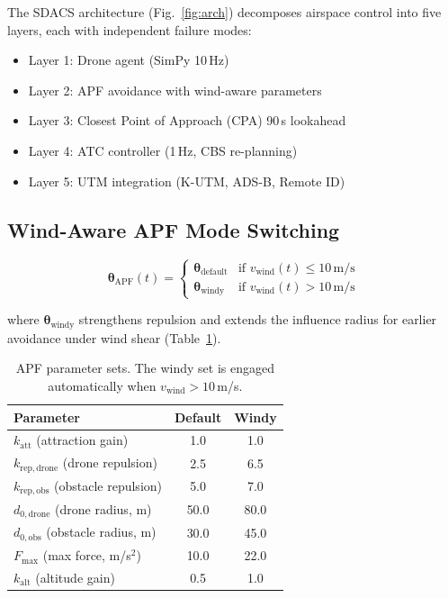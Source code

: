 \documentclass[letterpaper, 10pt, conference]{ieeeconf}
\begin{document}
The SDACS architecture (Fig.~\ref{fig:arch}) decomposes airspace
control into five layers, each with independent failure modes:
\begin{itemize}
    \item Layer 1: Drone agent (SimPy 10\,Hz)
    \item Layer 2: APF avoidance with wind-aware parameters
    \item Layer 3: Closest Point of Approach (CPA) 90\,s lookahead
    \item Layer 4: ATC controller (1\,Hz, CBS re-planning)
    \item Layer 5: UTM integration (K-UTM, ADS-B, Remote ID)
\end{itemize}

\subsection{Wind-Aware APF Mode Switching}

\begin{equation}
\boldsymbol{\theta}_{\mathrm{APF}}(t) =
\begin{cases}
\boldsymbol{\theta}_{\mathrm{default}} & \text{if } v_{\mathrm{wind}}(t) \le 10 \, \mathrm{m/s} \\
\boldsymbol{\theta}_{\mathrm{windy}}   & \text{if } v_{\mathrm{wind}}(t) > 10 \, \mathrm{m/s}
\end{cases}
\end{equation}

where $\boldsymbol{\theta}_{\mathrm{windy}}$ strengthens repulsion and
extends the influence radius for earlier avoidance under wind shear
(Table~\ref{tab:apf}).

\begin{table}[t]
\caption{APF parameter sets. The windy set is engaged automatically
when $v_{\mathrm{wind}} > 10$\,m/s.}
\label{tab:apf}
\centering
\begin{tabular}{lcc}
\hline
Parameter & Default & Windy \\
\hline
$k_{\mathrm{att}}$ (attraction gain)      & 1.0  & 1.0  \\
$k_{\mathrm{rep,drone}}$ (drone repulsion)& 2.5  & 6.5  \\
$k_{\mathrm{rep,obs}}$ (obstacle repulsion)& 5.0 & 7.0  \\
$d_{0,\mathrm{drone}}$ (drone radius, m)  & 50.0 & 80.0 \\
$d_{0,\mathrm{obs}}$ (obstacle radius, m) & 30.0 & 45.0 \\
$F_{\max}$ (max force, m/s$^2$)           & 10.0 & 22.0 \\
$k_{\mathrm{alt}}$ (altitude gain)        & 0.5  & 1.0  \\
\hline
\end{tabular}
\end{table}
\end{document}
